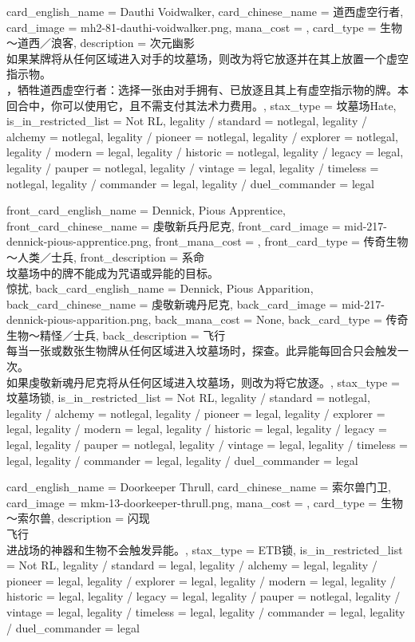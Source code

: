 \documentclass[lang = cn, color = black, 10pt]{AllThatStax}
\begin{document}
\card
{
	card_english_name = {Dauthi Voidwalker},
	card_chinese_name = {道西虚空行者},
	card_image = mh2-81-dauthi-voidwalker.png,
	mana_cost = ,
	card_type = 生物～道西／浪客,
	description = {次元幽影\\
如果某牌将从任何区域进入对手的坟墓场，则改为将它放逐并在其上放置一个虚空指示物。\\
，牺牲道西虚空行者：选择一张由对手拥有、已放逐且其上有虚空指示物的牌。本回合中，你可以使用它，且不需支付其法术力费用。},
	stax_type = 坟墓场Hate,
	is_in_restricted_list = Not RL,
	legality / standard = notlegal,
	legality / alchemy = notlegal,
	legality / pioneer = notlegal,
	legality / explorer = notlegal,
	legality / modern = legal,
	legality / historic = notlegal,
	legality / legacy = legal,
	legality / pauper = notlegal,
	legality / vintage = legal,
	legality / timeless = notlegal,
	legality / commander = legal,
	legality / duel_commander = legal
}

\mfcard
{
	front_card_english_name = {Dennick, Pious Apprentice},
	front_card_chinese_name = {虔敬新兵丹尼克},
	front_card_image = mid-217-dennick-pious-apprentice.png,
	front_mana_cost = ,
	front_card_type = 传奇生物～人类／士兵,
	front_description = {系命\\
坟墓场中的牌不能成为咒语或异能的目标。\\
惊扰},
	back_card_english_name = {Dennick, Pious Apparition},
	back_card_chinese_name = {虔敬新魂丹尼克},
	back_card_image = mid-217-dennick-pious-apparition.png,
	back_mana_cost = None,
	back_card_type = 传奇生物～精怪／士兵,
	back_description = {飞行\\
每当一张或数张生物牌从任何区域进入坟墓场时，探查。此异能每回合只会触发一次。\\
如果虔敬新魂丹尼克将从任何区域进入坟墓场，则改为将它放逐。},
	stax_type = 坟墓场锁,
	is_in_restricted_list = Not RL,
	legality / standard = notlegal,
	legality / alchemy = notlegal,
	legality / pioneer = legal,
	legality / explorer = legal,
	legality / modern = legal,
	legality / historic = legal,
	legality / legacy = legal,
	legality / pauper = notlegal,
	legality / vintage = legal,
	legality / timeless = legal,
	legality / commander = legal,
	legality / duel_commander = legal
}

\card
{
	card_english_name = {Doorkeeper Thrull},
	card_chinese_name = {索尔兽门卫},
	card_image = mkm-13-doorkeeper-thrull.png,
	mana_cost = ,
	card_type = 生物～索尔兽,
	description = {闪现\\
飞行\\
进战场的神器和生物不会触发异能。},
	stax_type = ETB锁,
	is_in_restricted_list = Not RL,
	legality / standard = legal,
	legality / alchemy = legal,
	legality / pioneer = legal,
	legality / explorer = legal,
	legality / modern = legal,
	legality / historic = legal,
	legality / legacy = legal,
	legality / pauper = notlegal,
	legality / vintage = legal,
	legality / timeless = legal,
	legality / commander = legal,
	legality / duel_commander = legal
}
\end{document}
